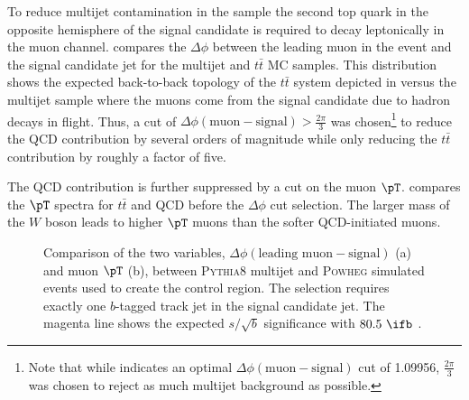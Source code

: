 To reduce multijet contamination in the sample the second top quark in the
opposite hemisphere of the signal candidate is required to decay leptonically
in the muon channel.  compares the $\Delta\phi$
between the leading muon in the event and the signal candidate jet for the
multijet and $t\bar{t}$ MC samples. This distribution shows the expected
back-to-back topology of the $t\bar{t}$ system depicted in
 versus the multijet sample where the muons
come from the signal candidate due to hadron decays in flight. Thus, a cut of
$\Delta\phi(\text{muon} - \text{signal}) > \frac{2\pi}{3}$ was chosen\footnote{Note that
while  indicates an optimal
$\Delta\phi(\text{muon} - \text{signal})$ cut of 1.09956, $\frac{2\pi}{3}$ was
chosen to reject as much multijet background as possible.} to reduce
the QCD contribution by several orders of magnitude while only reducing the
$t\bar{t}$ contribution by roughly a factor of five.

The QCD contribution is further suppressed by a cut on the muon $\pT$.
 compares the $\pT$ spectra for $t\bar{t}$ and
QCD before the $\Delta\phi$ cut selection. The larger mass of the $W$
boson leads to higher $\pT$ muons than the softer QCD-initiated muons.

\begin{figure}[!htbp]
\centering
{}\hfill
{}
\caption{Comparison of the two variables, $\Delta \phi(\text{leading muon}-\text{signal})$ (a) and muon $\pT$ (b), between \textsc{Pythia}8 multijet and \textsc{Powheg} \ttbar simulated events used to create the \ttbar control region. The selection requires exactly one $b$-tagged track jet in the signal candidate \largeR jet. The magenta line shows the expected $s/\sqrt{b}$ significance with $80.5~\ifb$ \cite{Alison:2649017}.}
\label{sec:background:qcd_rejection_studies}
\end{figure}

